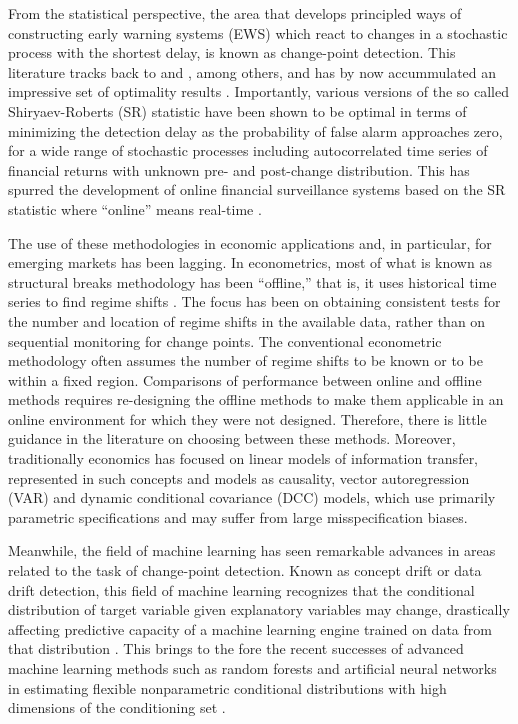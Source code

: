 From the statistical perspective, the area that develops principled ways of constructing early warning systems (EWS) which react to changes in a stochastic process with the shortest delay, is known as change-point detection. This literature tracks back to \cite{shiryaev:61, Shiryaev} and \cite{Roberts}, among others, and has by now accummulated an impressive set of optimality results \cite[see, e.g.,][]{Chen:19, Chu/chen:19, Pergamenchtchikov/tartakovsky:18, Pergamenchtchikov/tartakovsky:19}. Importantly, various versions of the so called Shiryaev-Roberts (SR) statistic have been shown to be optimal in terms of minimizing the detection delay as the probability of false alarm approaches zero, for a wide range of stochastic processes including autocorrelated time series of financial returns with unknown pre- and post-change distribution. This has spurred the development of online financial surveillance systems based on the SR statistic where ``online'' means real-time \cite[see, e.g.,][]{pepelyshev/poluchenko}.

The use of these methodologies in economic applications and, in particular, for emerging markets has been lagging. In econometrics, most of what is known as structural breaks methodology has been ``offline,'' that is, it uses historical time series to find regime shifts \cite[see, e.g.,][]{HAMILTON:16, Bai-Perron, bai/perron:03}. The focus has been on obtaining consistent tests for the number and location of regime shifts in the available data, rather than on sequential monitoring for change points. The conventional econometric methodology often assumes the number of regime shifts to be known or to be within a fixed region. Comparisons of performance between online and offline methods requires re-designing the offline methods to make them applicable in an online environment for which they were not designed. Therefore, there is little guidance in the literature on choosing between these methods. Moreover, traditionally economics has focused on linear models of information transfer, represented in such concepts and models as \cite{granger:69} causality, vector autoregression (VAR) and dynamic conditional covariance (DCC) models, which use primarily parametric specifications and may suffer from large misspecification biases. 

Meanwhile, the field of machine learning has seen remarkable advances in areas related to the task of change-point detection. Known as concept drift or data drift detection, this field of machine learning recognizes that the conditional distribution of target variable given explanatory variables may change, drastically affecting predictive capacity of a machine learning engine trained on data from that distribution \cite[see, e.g.,][]{Hoens, Han}. This brings to the fore the recent successes of advanced machine learning methods such as random forests and artificial neural networks in estimating flexible nonparametric  conditional distributions with high dimensions of the conditioning set \cite[see, e.g.,][]{Breiman, Pospisil, Friedberg}. 






